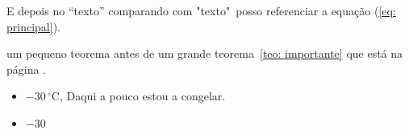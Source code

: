 \documentclass[Tese.tex]{subfiles}
\begin{document}

E depois no ``texto'' comparando com "texto"\  posso refe\-renciar a equação (\ref{eq: principal}).




\begin{lemma}
	um pequeno teorema antes de um grande teorema~\ref{teo: importante} que está na página \pageref{teo: importante}.

\end{lemma}



\begin{itemize}

\item  $-30\,^{\circ}\mathrm{C}$, Daqui a pouco estou a congelar. 

\item  $-30$~\textcelsius

\end{itemize}
\end{document}
